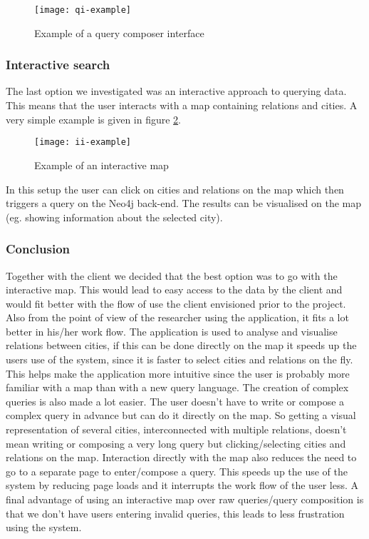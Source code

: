 \begin{figure}[ht]
\centering
\texttt{[image: qi-example]}
\caption{Example of a query composer interface}
\label{fig:qi-example}
\end{figure}

\subsubsection{Interactive search}

The last option we investigated was an interactive approach to querying data. This means that the user interacts with a map containing relations and cities. A very simple example is given in figure \ref{fig:ii-example}.


\begin{figure}[ht]
\centering
\texttt{[image: ii-example]}
\caption{Example of an interactive map}
\label{fig:ii-example}
\end{figure}

In this setup the user can click on cities and relations on the map which then triggers a query on the Neo4j back-end. The results can be visualised on the map (eg. showing information about the selected city).

\subsubsection{Conclusion}

Together with the client we decided that the best option was to go with the interactive map. This would lead to easy access to the data by the client and would fit better with the flow of use the client envisioned prior to the project. 
Also from the point of view of the researcher using the application, it fits a lot better in his/her work flow. The application is used to analyse and visualise relations between cities, if this can be done directly on the map it speeds up the users use of the system, since it is faster to select cities and relations on the fly. This helps make the application more intuitive since the user is probably more familiar with a map than with a new query language.
The creation of complex queries is also made a lot easier. The user doesn't have to write or compose a complex query in advance but can do it directly on the map. So getting a visual representation of several cities, interconnected with multiple relations, doesn't mean writing or composing a very long query but clicking/selecting cities and relations on the map.
Interaction directly with the map also reduces the need to go to a separate page to enter/compose a query. This speeds up the use of the system by reducing page loads and it interrupts the work flow of the user less.
A final advantage of using an interactive map over raw queries/query composition is that we don't have users entering invalid queries, this leads to less frustration using the system.